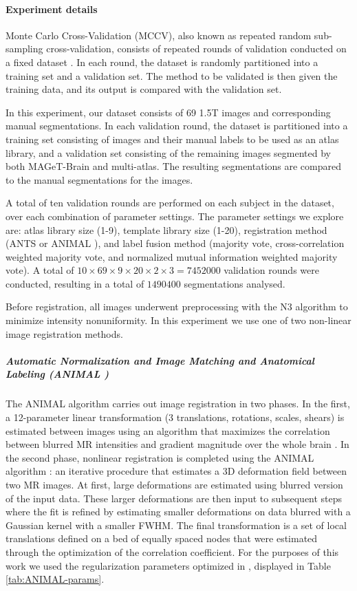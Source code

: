 \documentclass{article}\usepackage{graphicx, color}
\newcommand{\mb}{MAGeT-Brain }
\newcommand{\ants}{ANTS }
\newcommand{\animal}{ANIMAL }
\begin{document}

\paragraph{Experiment details} 

Monte Carlo Cross-Validation (MCCV), also known as repeated random sub-sampling
cross-validation, consists of repeated rounds of validation conducted on a fixed
dataset \citep{Shao1993}. In each round, the dataset is randomly partitioned into
a training set and a validation set. The method to be validated is then given
the training data, and its output is compared with the validation set.

In this experiment, our dataset consists of 69 1.5T images and corresponding
manual segmentations. In each validation round, the dataset is partitioned into 
a training set consisting of images and their manual labels to be used as an atlas 
library, and a validation set consisting of the remaining images segmented by both 
\mb and multi-atlas. The resulting segmentations are compared to the manual 
segmentations for the images.

A total of ten validation rounds are performed on each subject in the dataset,
over each combination of parameter settings. The parameter settings
we explore are: atlas library size (1-9), template library size (1-20),
registration method (\ants or \animal), and label fusion method (majority vote,
cross-correlation weighted majority vote, and normalized mutual information
weighted majority vote).  A total of $10 \times 69 \times 9 \times 20 \times 2
\times 3 = \num{7452000}$ validation rounds were conducted, resulting in a total
of $\num{1490400}$ segmentations analysed. 

Before registration, all images underwent preprocessing with the N3 algorithm
\citep{Sled1998} to minimize intensity nonuniformity. In this experiment we use
one of two non-linear image registration methods.

\subparagraph{Automatic Normalization and Image Matching and Anatomical
Labeling (\animal)}

The \animal algorithm carries out image registration in two phases. In the
first, a 12-parameter linear transformation (3 translations, rotations, scales,
shears) is estimated between images using an algorithm that maximizes the
correlation between blurred MR intensities and gradient magnitude over the whole
brain \citep{Collins}. In the second phase, nonlinear registration is completed
using the \animal algorithm \citep{Collins1995}: an iterative procedure that
estimates a 3D deformation field between two MR images. At first, large
deformations are estimated using blurred version of the input data. These larger
deformations are then input to subsequent steps where the fit is refined by
estimating smaller deformations on data blurred with a Gaussian kernel with a
smaller FWHM. The final transformation is a set of local translations defined on
a bed of equally spaced nodes that were estimated through the optimization of
the correlation coefficient.  For the purposes of this work we used the
regularization parameters optimized in \citet{Robbins2004}, displayed in Table
\ref{tab:ANIMAL-params}. 
\end{document}
